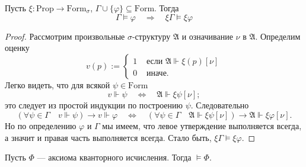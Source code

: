 \documentclass[12pt,a4paper]{article}
\newcommand{\Prop}{\ensuremath{\mathrm{Prop}}\xspace}
\newcommand{\Formul}{\ensuremath{\mathrm{Form}}\xspace}
\begin{document}
    \begin{lemma}
        Пусть $\xi: \Prop \rightarrow \Formul_\sigma$, $\Gamma \cup \{\varphi\} \subseteq \Formul$. Тогда
        \[
            \Gamma \vDash \varphi
            \quad \Longrightarrow \quad
            \xi \Gamma \vDash \xi \varphi
        \]
    \end{lemma}
    
    \begin{proof}
        Рассмотрим произвольные $\sigma$-структуру $\mathfrak{A}$ и означивание $\nu$ в $\mathfrak{A}$. Определим оценку
        \[
            v(p) :=
            \begin{cases}
                1& \text{ если $\mathfrak{A} \Vdash \xi(p) [\nu]$}\\
                0& \text{ иначе.}
            \end{cases}
        \]
        Легко видеть, что для всякой $\psi \in \Formul$
        \[
            v \Vdash \psi
            \quad \Longleftrightarrow \quad
            \mathfrak{A} \Vdash \xi \psi [\nu];
        \]
        это следует из простой индукции по построению $\psi$. Следовательно
        \[
            (\forall \psi \in \Gamma \quad v \Vdash \psi) \rightarrow v \Vdash \varphi
            \quad \Longleftrightarrow \quad
            (\forall \psi \in \Gamma \quad \mathfrak{A} \Vdash \xi \psi [\nu]) \rightarrow \mathfrak{A} \Vdash \xi \varphi [\nu].
        \]
        Но по определению $\varphi$ и $\Gamma$ мы имеем, что левое утверждение выполняется всегда, а значит и правая часть выполняется всегда. Стало быть, $\xi \Gamma \vDash \xi \varphi$.
    \end{proof}

    \begin{lemma}
        Пусть $\Phi$ --- аксиома кванторного исчисления. Тогда $\vDash \Phi$.
    \end{lemma}
\end{document}

